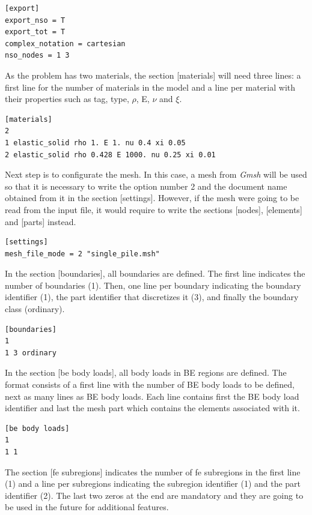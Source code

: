 \documentclass[a4]{article}
\begin{document}
\begin{Verbatim}
[export]
export_nso = T
export_tot = T
complex_notation = cartesian
nso_nodes = 1 3
\end{Verbatim}

As the problem has two materials, the section [materials] will need three lines: a first line for the number of materials in the model and a line per material with their properties such as tag, type, $\rho$, E, $\nu$ and $ \xi $.

\begin{Verbatim}
[materials]
2
1 elastic_solid rho 1. E 1. nu 0.4 xi 0.05
2 elastic_solid rho 0.428 E 1000. nu 0.25 xi 0.01
\end{Verbatim}

Next step is to configurate the mesh. In this case, a mesh from \textit{Gmsh} will be used so that it is necessary to write the option number 2 and the document name obtained from it in the section [settings]. However, if the mesh were going to be read from the input file, it would require to write the sections [nodes], [elements] and [parts] instead.

\begin{Verbatim}	
[settings]
mesh_file_mode = 2 "single_pile.msh"
\end{Verbatim}

In the section [boundaries], all boundaries are defined. The first line indicates the number of boundaries (1). Then, one line per boundary indicating the boundary identifier (1), the part identifier that discretizes it (3), and finally the boundary class (ordinary).

\begin{Verbatim}
[boundaries]
1
1 3 ordinary
\end{Verbatim}

In the section [be body loads], all body loads in BE regions are defined. The format consists of a first line with the number of BE body loads to be defined, next as many lines as BE body loads. Each line contains first the BE body load identifier and last the mesh part which contains the elements associated with it.

\begin{Verbatim}
[be body loads]
1
1 1
\end{Verbatim}

The section [fe subregions] indicates the number of fe subregions in the first line (1) and a line per subregions indicating the subregion identifier (1) and the part identifier (2). The last two zeros at the end are mandatory and they are going to be used in the future for additional features.
\end{document}
